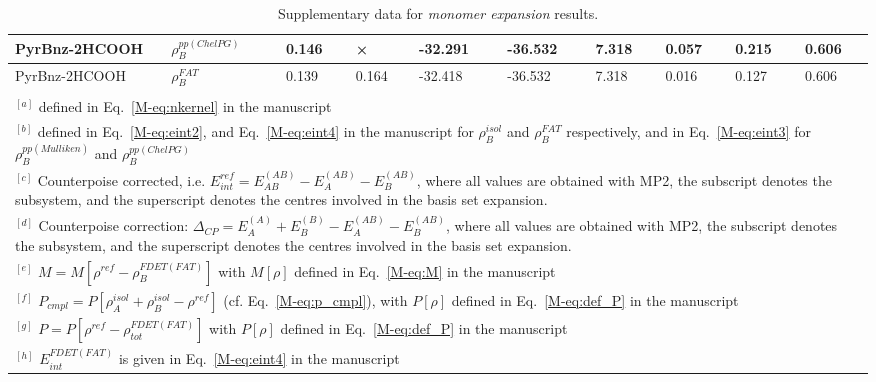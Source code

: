 \documentclass[amsmath,amssymb,preprint,aip,jcp]{revtex4-1}
\begin{document}
\begin{table}[H]
\begin{center}
{\begin{tabular}{|l|l|l|l|l|l|l|l|l|l|}
PyrBnz-2HCOOH & $\rho_B^{pp(ChelPG)}$ & 0.146 & × & -32.291 & -36.532 & 7.318 & 0.057 & 0.215 & 0.606\\\hline
PyrBnz-2HCOOH & $\rho_B^{FAT}$ & 0.139 & 0.164 & -32.418 & -36.532 & 7.318 & 0.016 & 0.127 & 0.606\\\hline
\multicolumn{10}{c}{ } \\
\multicolumn{10}{p{1.0\textwidth}}{$^{[a]}$ defined in Eq.~\ref{M-eq:nkernel} in the manuscript}\\
\multicolumn{10}{p{1.0\textwidth}}{$^{[b]}$ defined in Eq.~\ref{M-eq:eint2}, and Eq.~\ref{M-eq:eint4} in the manuscript for $\rho_B^{isol}$ and $\rho_B^{FAT }$ respectively, and in Eq.~\ref{M-eq:eint3} for $\rho_B^{pp(Mulliken)}$ and $\rho_B^{pp(ChelPG)}$}\\
\multicolumn{10}{p{1.0\textwidth}}{$^{[c]}$ Counterpoise corrected, i.e. $E_{int}^{ref} = E_{AB}^{(AB)} - E_{A}^{(AB)} - E_{B}^{(AB)}$, where all values are obtained with MP2, the subscript denotes the subsystem, and the superscript denotes the centres involved in the basis set expansion.} \\
\multicolumn{10}{p{1.0\textwidth}}{$^{[d]}$ Counterpoise correction: $\Delta_{CP} = E_{A}^{(A)} + E_{B}^{(B)} - E_{A}^{(AB)} - E_{B}^{(AB)}$, where all values are obtained with MP2, the subscript denotes the subsystem, and the superscript denotes the centres involved in the basis set expansion.} \\
\multicolumn{10}{p{1.0\textwidth}}{$^{[e]}$ $M=M[\rho^{ref} - \rho^{FDET(FAT)}_{B}]$ with $M[\rho]$ defined in Eq.~\ref{M-eq:M} in the manuscript}\\
\multicolumn{10}{p{1.0\textwidth}}{$^{[f]}$ $P_{cmpl}=P[\rho_A^{isol}+\rho_B^{isol} - \rho^{ref}]$ (cf. Eq.~\ref{M-eq:p_cmpl}), with $P[\rho]$ defined in Eq.~\ref{M-eq:def_P} in the manuscript}\\
\multicolumn{10}{p{1.0\textwidth}}{$^{[g]}$ $P=P[\rho^{ref} - \rho_{tot}^{FDET(FAT)}]$ with $P[\rho]$ defined in Eq.~\ref{M-eq:def_P} in the manuscript}\\
\multicolumn{10}{p{1.0\textwidth}}{$^{[h]}$ $E^{FDET(FAT)}_{int}$ is given in Eq.~\ref{M-eq:eint4} in the manuscript}\\
\end{tabular}
}
\end{center}
\caption{Supplementary data for \textit{monomer expansion} results.}
\end{table}
\end{document}
